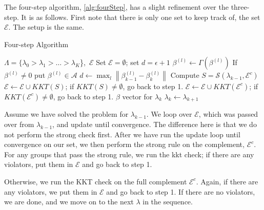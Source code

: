 \documentclass[titlepage]{article}
\newcommand{\norm}[1]{\left\lVert #1 \right\rVert}
\begin{document}
The four-step algorithm, \autoref{alg:fourStep}, has a slight refinement over the three-step. It is as follows. First note that there is only one set to keep track of, the set $\mathcal{E}$. The setup is the same.

\begin{algorithm}
  \caption{Four-step Algorithm\label{alg:fourStep}}
  \begin{algorithmic}
     $\Lambda = \{\lambda_0>\lambda_1> \dots > \lambda_K$\},\ $\mathcal{E}$
    \STATE Set $\mathcal{E}=\emptyset$; set $d=\epsilon+1$ 
    \STATE  $\beta^{(l)} \leftarrow \Gamma (\beta^{(l)})$
    \STATE If $\beta^{(l)} \neq 0$ put $\beta^{(l)} \in \mathcal{A}$	
	\ENDFOR
	\STATE $d \leftarrow \max_{l} \norm{\beta^{(l)}_{k-1}-\beta^{(l)}_{k}}$ 
	\ENDWHILE    
     Compute $S = \mathcal{S}(\lambda_{k-1}, \mathcal{E}^c)$
     $\mathcal{E} \leftarrow  \mathcal{E}\cup KKT(S)$; if $KKT(S) \neq \emptyset$, go back to step 1.  
	 $\mathcal{E} \leftarrow  \mathcal{E}\cup KKT(\mathcal{E}^c)$; if $KKT(\mathcal{E}^c) \neq \emptyset$, go back to step 1.
    \RETURN $\beta$ vector for $\lambda_k$
    \STATE $\lambda_k \leftarrow \lambda_{k+1}$
  \end{algorithmic}
\end{algorithm}



Assume we have solved the problem for $\lambda_{k-1}$. We loop over $\mathcal{E}$, which was passed over from $\lambda_{k-1}$, and update until convergence. The difference here is that we do not perform the strong check first. After we have run the update loop until convergence on our set, we then perform the strong rule on the complement, $\mathcal{E}^c$. For any groups that pass the strong rule, we run the kkt check; if there are any violators, put them in $\mathcal{E}$ and go back to step 1. 

Otherwise, we run the KKT check on the full complement $\mathcal{E}^c$. Again, if there are any violators, we put them in $\mathcal{E}$ and go back to step 1. If there are no violators, we are done, and we move on to the next $\lambda$ in the sequence.

\end{document}
